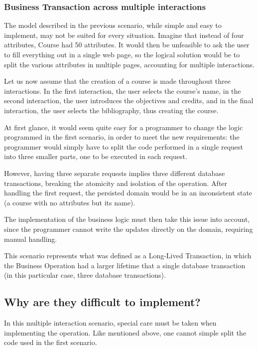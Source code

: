 \documentclass{llncs}
\begin{document}
\subsubsection{Business Transaction across multiple interactions}

The model described in the previous scenario, while simple and easy to
implement, may not be suited for every situation. Imagine that instead
of four attributes, Course had 50 attributes. It would then be
unfeasible to ask the user to fill everything out in a single web
page, so the logical solution would be to split the various attributes
in multiple pages, accounting for multiple interactions.

Let us now assume that the creation of a course is made throughout
three interactions. In the first interaction, the user selects the
course's name, in the second interaction, the user introduces the
objectives and credits, and in the final interaction, the user selects
the bibliography, thus creating the course.

At first glance, it would seem quite easy for a programmer to change
the logic programmed in the first scenario, in order to meet the new
requirements: the programmer would simply have to split the code
performed in a single request into three smaller parts, one to be
executed in each request.

However, having three separate requests implies three different
database transactions, breaking the atomicity and isolation of the
operation. After handling the first request, the persisted domain
would be in an inconsistent state (a course with no attributes but its
name).

The implementation of the business logic must then take this issue
into account, since the programmer cannot write the updates directly
on the domain, requiring manual handling.

This scenario represents what was defined as a Long-Lived Transaction,
in which the Business Operation had a larger lifetime that a single
database transaction (in this particular case, three database transactions).

\subsection{Why are they difficult to implement?}

In this multiple interaction scenario, special care must be taken when
implementing the operation. Like mentioned above, one cannot simple
split the code used in the first scenario.
\end{document}
